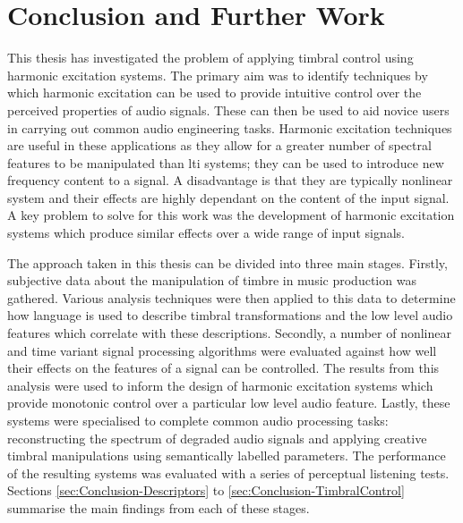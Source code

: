\chapter{Conclusion and Further Work}
\label{chap:Conclusion}

	This thesis has investigated the problem of applying timbral control using harmonic excitation systems. The primary
	aim was to identify techniques by which harmonic excitation can be used to provide intuitive control over the
	perceived properties of audio signals. These can then be used to aid novice users in carrying out common audio
	engineering tasks. Harmonic excitation techniques are useful in these applications as they allow for a greater
	number of spectral features to be manipulated than \acrshort{lti} systems; they can be used to introduce new
	frequency content to a signal. A disadvantage is that they are typically nonlinear system and their effects are
	highly dependant on the content of the input signal. A key problem to solve for this work was the development of
	harmonic excitation systems which produce similar effects over a wide range of input signals.

	The approach taken in this thesis can be divided into three main stages. Firstly, subjective data about the
	manipulation of timbre in music production was gathered. Various analysis techniques were then applied to this data
	to determine how language is used to describe timbral transformations and the low level audio features which
	correlate with these descriptions. Secondly, a number of nonlinear and time variant signal processing algorithms
	were evaluated against how well their effects on the features of a signal can be controlled. The results from this
	analysis were used to inform the design of harmonic excitation systems which provide monotonic control over a
	particular low level audio feature. Lastly, these systems were specialised to complete common audio processing
	tasks: reconstructing the spectrum of degraded audio signals and applying creative timbral manipulations using
	semantically labelled parameters. The performance of the resulting systems was evaluated with a series of perceptual
	listening tests. Sections \ref{sec:Conclusion-Descriptors} to \ref{sec:Conclusion-TimbralControl} summarise the main
	findings from each of these stages.

